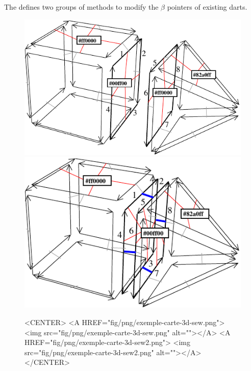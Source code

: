 The  defines two groups of methods to modify the
$\beta$ pointers of existing darts.

\def\LargFig{.45\textwidth}
\begin{figure}
  \begin{ccTexOnly}
    \begin{center}
      \includegraphics[width=\LargFig]{Combinatorial_map/fig/pdf/exemple-carte-3d-sew}\qquad
      \includegraphics[width=\LargFig]{Combinatorial_map/fig/pdf/exemple-carte-3d-sew2}
    \end{center}
  \end{ccTexOnly}
  \begin{ccHtmlOnly}
    <CENTER> <A HREF="fig/png/exemple-carte-3d-sew.png"> <img
    src="fig/png/exemple-carte-3d-sew.png" alt=""></A> <A
    HREF="fig/png/exemple-carte-3d-sew2.png"> <img
    src="fig/png/exemple-carte-3d-sew2.png" alt=""></A> </CENTER>

\end{ccHtmlOnly}
\end{figure}
